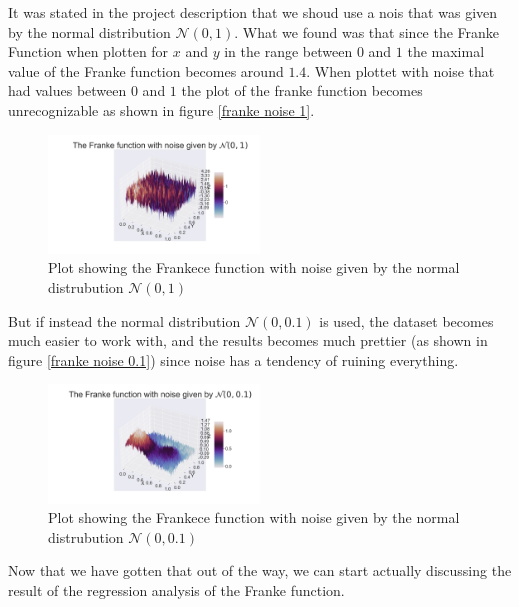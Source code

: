 \thispagestyle{plain}
\noindent It was stated in the project description that we shoud use a nois that was given by
the normal distribution $\mathcal{N}(0,1)$. What we found was that since the Franke
Function when plotten for $x$ and $y$ in the range between $0$ and $1$ the maximal 
value of the Franke function becomes around $1.4$. When plottet with noise that had values
between $0$ and $1$ the plot of the franke function becomes unrecognizable as shown in figure \eqref{franke noise 1}. 
\begin{figure}[H]
	\centering
	\includegraphics[width=0.5\textwidth]{Figure_13.png}
	\caption{Plot showing the Frankece function with noise given by the normal distrubution $\mathcal{N}(0,1)$ }
	\label{franke noise 1}
\end{figure}
\noindent But if instead the normal distribution $\mathcal{N}(0,0.1)$ is 
used, the dataset becomes much easier to work with, and the results becomes 
much prettier (as shown in figure \eqref{franke noise 0.1}) since noise has a tendency of ruining everything.
\begin{figure}[H]
	\centering
	\includegraphics[width=0.5\textwidth]{Figure_14.png}
	\caption{Plot showing the Frankece function with noise given by the normal distrubution $\mathcal{N}(0,0.1)$ }
	\label{franke noise 0.1}
\end{figure}
\noindent Now that we have gotten that out of the way, we can start actually
discussing the result of the regression analysis of the Franke function.

